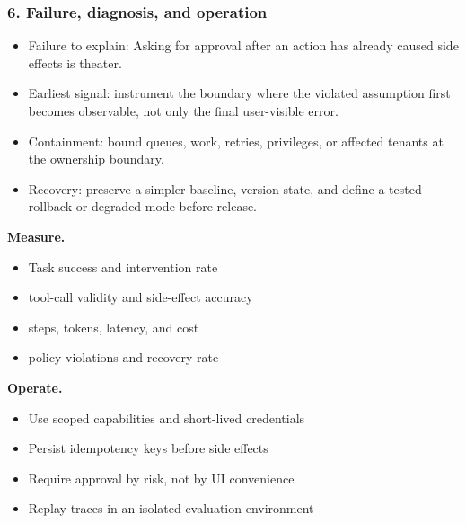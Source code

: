 \subsubsection*{6. Failure, diagnosis, and operation}
\begin{itemize}
\item Failure to explain: Asking for approval after an action has already caused side effects is theater.
\item Earliest signal: instrument the boundary where the violated assumption first becomes observable, not only the final user-visible error.
\item Containment: bound queues, work, retries, privileges, or affected tenants at the ownership boundary.
\item Recovery: preserve a simpler baseline, version state, and define a tested rollback or degraded mode before release.
\end{itemize}
\textbf{Measure.}\begin{itemize}
\item Task success and intervention rate
\item tool-call validity and side-effect accuracy
\item steps, tokens, latency, and cost
\item policy violations and recovery rate
\end{itemize}
\textbf{Operate.}\begin{itemize}
\item Use scoped capabilities and short-lived credentials
\item Persist idempotency keys before side effects
\item Require approval by risk, not by UI convenience
\item Replay traces in an isolated evaluation environment
\end{itemize}
